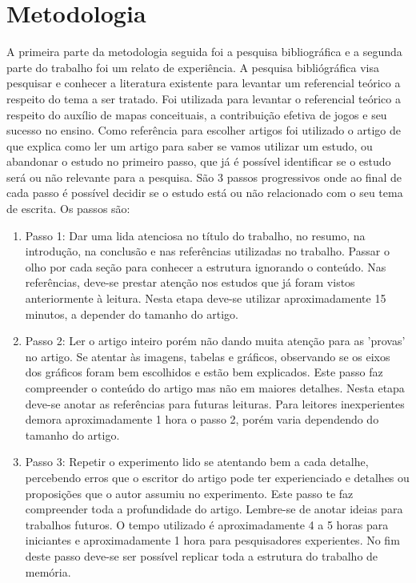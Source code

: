 \chapter[Metodologia]{Metodologia}
A primeira parte da metodologia seguida foi a pesquisa bibliográfica e a segunda parte do trabalho foi um relato de experiência. A pesquisa bibliógráfica visa pesquisar e conhecer a literatura existente para levantar um referencial teórico a respeito do tema a ser tratado. Foi utilizada para levantar o referencial teórico a respeito do auxílio de mapas conceituais, a contribuição efetiva de jogos e seu sucesso no ensino.
Como referência para escolher artigos foi utilizado o artigo de \cite{howtoread} que explica como ler um artigo para saber se vamos utilizar um estudo, ou abandonar o estudo no primeiro passo, que já é possível identificar se o estudo será ou não relevante para a pesquisa. São 3 passos progressivos onde ao final de cada passo é possível decidir se o estudo está ou não relacionado com o seu tema de escrita. Os passos são:

\begin{enumerate}
\item{Passo 1:} Dar uma lida atenciosa no título do trabalho, no resumo, na introdução, na conclusão e nas referências utilizadas no trabalho. Passar o olho por cada seção para conhecer a estrutura ignorando o conteúdo. Nas referências, deve-se prestar atenção nos estudos que já foram vistos anteriormente à leitura. Nesta etapa deve-se utilizar aproximadamente 15 minutos, a depender do tamanho do artigo.

\item{Passo 2:} Ler o artigo inteiro porém não dando muita atenção para as 'provas' no artigo. Se atentar às imagens, tabelas e gráficos, observando se os eixos dos gráficos foram bem escolhidos e estão bem explicados. Este passo faz compreender o conteúdo do artigo mas não em maiores detalhes. Nesta etapa deve-se anotar as referências para futuras leituras. Para leitores inexperientes demora aproximadamente 1 hora o passo 2, porém varia dependendo do tamanho do artigo.

\item{Passo 3:} Repetir o experimento lido se atentando bem a cada detalhe, percebendo erros que o escritor do artigo pode ter experienciado e detalhes ou proposições que o autor assumiu no experimento. Este passo te faz compreender toda a profundidade do artigo. Lembre-se de anotar ideias para trabalhos futuros. O tempo utilizado é aproximadamente 4 a 5 horas para iniciantes e aproximadamente 1 hora para pesquisadores experientes. No fim deste passo deve-se ser possível replicar toda a estrutura do trabalho de memória.
\end{enumerate}

